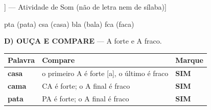 \begin{exercicio}[Som /a/ [[a]] --- Atividade de Som (não de letra nem de sílaba)]
\begin{center}
\large p\underline{\hspace{0.7cm}}ta (pata) \quad c\underline{\hspace{0.7cm}}sa (casa) \quad b\underline{\hspace{0.7cm}}la (bala) \quad f\underline{\hspace{0.7cm}}ca (faca)
\end{center}

\textbf{D) OUÇA E COMPARE} --- A forte e A fraco.

\begin{center}
\begin{tabular}{@{}p{4.2cm}p{6.2cm}p{1.6cm}@{}}
\hline
\textbf{Palavra} & \textbf{Compare} & \textbf{Marque} \\
\hline
\textbf{casa} & o primeiro A é forte [a], o último é fraco & \textbf{SIM} \\
\textbf{cama} & CA é forte; o A final é fraco & \textbf{SIM} \\
\textbf{pata} & PA é forte; o A final é fraco & \textbf{SIM} \\
\hline
\end{tabular}
\end{center}

\end{exercicio}

